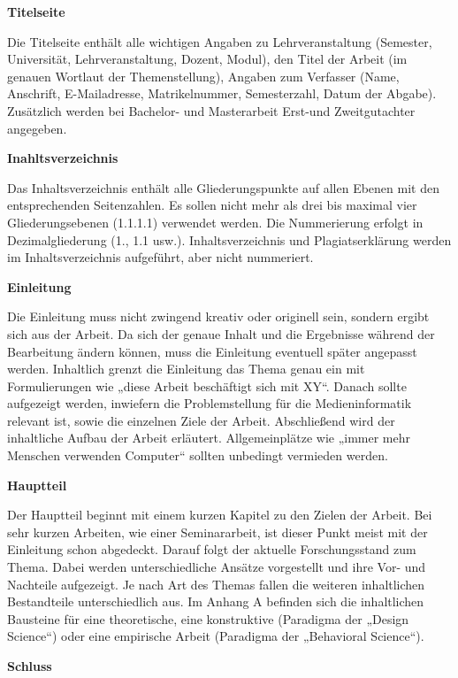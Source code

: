 \bigskip
\textbf{Titelseite}

Die Titelseite enthält alle wichtigen Angaben zu Lehrveranstaltung (Semester, Universität, Lehrveranstaltung, Dozent, Modul), den Titel der Arbeit (im genauen Wortlaut der Themenstellung), Angaben zum Verfasser (Name, Anschrift, E-Mailadresse, Matrikelnummer, Semesterzahl, Datum der Abgabe). Zusätzlich werden bei Bachelor- und Masterarbeit Erst-und Zweitgutachter angegeben.

\bigskip
\textbf{Inahltsverzeichnis}

Das Inhaltsverzeichnis enthält alle Gliederungspunkte auf allen Ebenen mit den entsprechenden Seitenzahlen. Es sollen nicht mehr als drei bis maximal vier Gliederungsebenen (1.1.1.1) verwendet werden. Die Nummerierung erfolgt in Dezimalgliederung (1., 1.1 usw.). Inhaltsverzeichnis und Plagiatserklärung werden im Inhaltsverzeichnis aufgeführt, aber nicht nummeriert.

\bigskip
\textbf{Einleitung}

Die Einleitung muss nicht zwingend kreativ oder originell sein, sondern ergibt sich aus der Arbeit. Da sich der genaue Inhalt und die Ergebnisse während der Bearbeitung ändern können, muss die Einleitung eventuell später angepasst werden. Inhaltlich grenzt die Einleitung das Thema genau ein mit Formulierungen wie „diese Arbeit beschäftigt sich mit XY“. Danach sollte aufgezeigt werden, inwiefern die Problemstellung für die Medieninformatik relevant ist, sowie die einzelnen Ziele der Arbeit. Abschließend wird der inhaltliche Aufbau der Arbeit erläutert. Allgemeinplätze wie „immer mehr Menschen verwenden Computer“ sollten unbedingt vermieden werden.

\bigskip
\textbf{Hauptteil}

Der Hauptteil beginnt mit einem kurzen Kapitel zu den Zielen der Arbeit. Bei sehr kurzen Arbeiten, wie einer Seminararbeit, ist dieser Punkt meist mit der Einleitung schon abgedeckt. Darauf folgt der aktuelle Forschungsstand zum Thema. Dabei werden unterschiedliche Ansätze vorgestellt und ihre Vor- und Nachteile aufgezeigt. Je nach Art des Themas fallen die weiteren inhaltlichen Bestandteile unterschiedlich aus. Im Anhang A befinden sich die inhaltlichen Bausteine für eine theoretische, eine konstruktive (Paradigma der „Design Science“) oder eine empirische Arbeit (Paradigma der „Behavioral Science“).

\bigskip
\textbf{Schluss}

